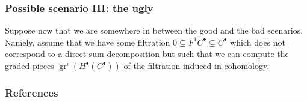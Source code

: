 \documentclass[notheorems, hyperref={backref}]{beamer}
\theoremstyle{darkgreentheorem}
\theoremstyle{darkbluedefinition}
\theoremstyle{darkredexample}
\theoremstyle{remark}
\DeclareMathOperator{\gr}{gr}
\begin{document}
\begin{frame}
    \frametitle{Possible scenario III: the ugly}
    Suppose now that we are somewhere in between the good and the bad scenarios.
    Namely, assume that we have some filtration $0\subsetneq F^{1}C^{\bullet} \subsetneq C^{\bullet}$ which does not correspond to a direct sum decomposition but such that we can compute the graded pieces $\gr^{i}(H^{\bullet}(C^{\bullet}))$ of the filtration induced in cohomology.
\end{frame}

\begin{frame}
    \frametitle{References}
    
    
\end{frame}
 
\end{document}
